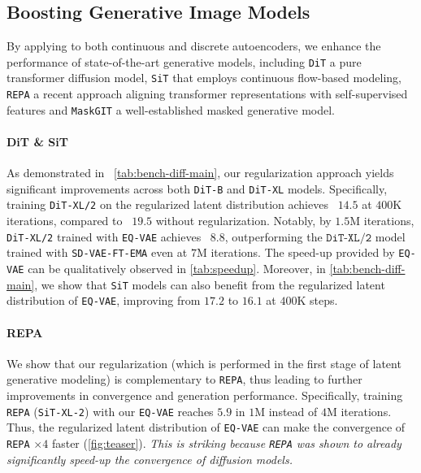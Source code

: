 

\subsection{Boosting Generative Image Models}

By applying \our to both continuous and discrete autoencoders, we enhance the performance of state-of-the-art generative models, including \texttt{DiT} a pure transformer diffusion model, \texttt{SiT} that employs continuous flow-based modeling, \texttt{REPA} a recent approach aligning transformer representations with self-supervised features and \texttt{MaskGIT} a well-established masked generative model.
\vspace{-10pt}
\paragraph{DiT \& SiT} 
As demonstrated in ~\autoref{tab:bench-diff-main}, our regularization approach yields significant improvements across both \texttt{DiT-B} and \texttt{DiT-XL} models. Specifically, training \texttt{DiT-XL/2} on the regularized latent distribution achieves  \mbox{ $14.5$} at $400\text{K}$ iterations, compared to \mbox{ $19.5$} without regularization. Notably, by $1.5\text{M}$ iterations, \texttt{DiT-XL/2} trained with \texttt{EQ-VAE} achieves \mbox{ $8.8$}, outperforming the $\texttt{DiT-XL/2}$ model trained with \texttt{SD-VAE-FT-EMA} even at $7\text{M}$ iterations. The speed-up provided by \texttt{EQ-VAE} can be qualitatively observed in \autoref{tab:speedup}.
Moreover, in \autoref{tab:bench-diff-main}, we show that \texttt{SiT} models can also benefit from the regularized latent distribution of \texttt{EQ-VAE}, improving  from $17.2$ to $16.1$ at $400\text{K}$ steps. 

\vspace{-10pt}
 \paragraph{REPA} We show that our regularization (which is performed in the first stage of latent generative modeling) is complementary to \texttt{REPA}, thus leading to further improvements in convergence and generation performance.
Specifically, training \texttt{REPA} (\texttt{SiT-XL-2}) with our \texttt{EQ-VAE} reaches  $5.9$  in $1\text{M}$ instead of $4\text{M}$ iterations. Thus, the regularized latent distribution of \texttt{EQ-VAE} can make the convergence of \texttt{REPA} $\times 4$ faster (\autoref{fig:teaser}). \emph{This is striking because \texttt{REPA} was shown to already significantly speed-up the convergence of diffusion models.}
\vspace{-10pt}
